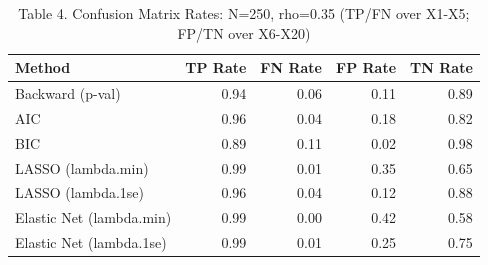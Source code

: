 \begin{table}[ht]
\centering
\caption{Table 4. Confusion Matrix Rates: N=250, rho=0.35 (TP/FN over X1-X5; FP/TN over X6-X20)} 
\begin{tabular}{lrrrr}
  \toprule
Method & TP Rate & FN Rate & FP Rate & TN Rate \\ 
  \midrule
Backward (p-val) & 0.94 & 0.06 & 0.11 & 0.89 \\ 
  AIC & 0.96 & 0.04 & 0.18 & 0.82 \\ 
  BIC & 0.89 & 0.11 & 0.02 & 0.98 \\ 
  LASSO (lambda.min) & 0.99 & 0.01 & 0.35 & 0.65 \\ 
  LASSO (lambda.1se) & 0.96 & 0.04 & 0.12 & 0.88 \\ 
  Elastic Net (lambda.min) & 0.99 & 0.00 & 0.42 & 0.58 \\ 
  Elastic Net (lambda.1se) & 0.99 & 0.01 & 0.25 & 0.75 \\ 
   \bottomrule
\end{tabular}
\end{table}
